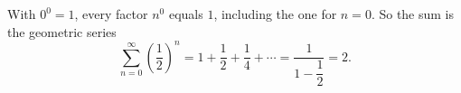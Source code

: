 With $0^0=1$, every factor $n^0$ equals $1$, including the one for $n=0$. So the sum is the geometric series
\[\sum_{n=0}^{\infty}\left(\dfrac{1}{2}\right)^n=1+\dfrac{1}{2}+\dfrac{1}{4}+\cdots=\dfrac{1}{1-\dfrac{1}{2}}=\boxed{2}.\]
